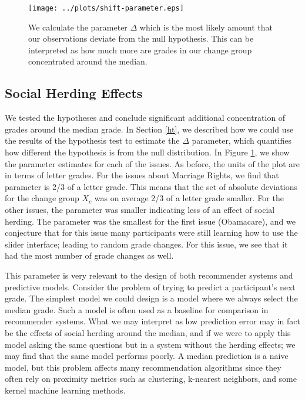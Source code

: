 \begin{figure}[ht!]
\centering
  \hspace{-3em}
    \texttt{[image: ../plots/shift-parameter.eps]}
      \caption{We calculate the parameter $\Delta$ which is the most likely amount that our observations deviate from the null hypothesis. This can be interpreted as how much more are grades in our change group concentrated around the median.}
      \label{shift-1}
\end{figure}
\subsection{Social Herding Effects}
We tested the hypotheses and conclude significant additional concentration of grades around the median grade.
In Section \ref{ht}, we described how we could use the results of the hypothesis test to estimate the $\Delta$ parameter, which quantifies how different the hypothesis is from the null distribution.
In Figure \ref{shift-1}, we show the parameter estimates for each of the issues.
As before, the units of the plot are in terms of letter grades.
For the issues about Marriage Rights, we find that parameter is 2/3 of a letter grade.
This means that the set of absolute deviations for the change group $X_c$ was on average 2/3 of a letter grade smaller.
For the other issues, the parameter was smaller indicating less of an effect of social herding.
The parameter was the smallest for the first issue (Obamacare), and we conjecture that for this issue many participants were still learning how to use the slider interface; leading to random grade changes.
For this issue, we see that it had the most number of grade changes as well.

This parameter is very relevant to the design of both recommender systems and predictive models.
Consider the problem of trying to predict a participant's next grade.
The simplest model we could design is a model where we always select the median grade.
Such a model is often used as a baseline for comparison in recommender systems.
What we may interpret as low prediction error may in fact be the effects of social herding around the median, and if we were to apply this model asking the same questions but in a system without the herding effects; we may find that the same model performs poorly.
A median prediction is a naive model, but this problem affects many recommendation algorithms since they often rely on proximity metrics such as clustering, k-nearest neighbors, and some kernel machine learning methods.
